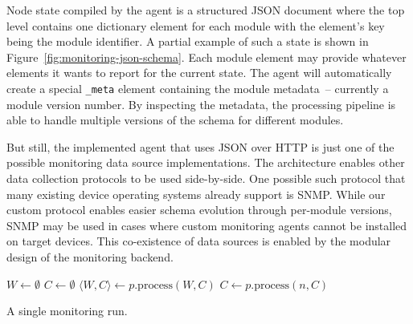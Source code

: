 \documentclass[5p,sort&compress]{elsarticle}
\begin{document}
Node state compiled by the agent is a structured JSON document where the top level contains one dictionary element for each module with the element's key being the module identifier.
A partial example of such a state is shown in Figure~\ref{fig:monitoring-json-schema}.
Each module element may provide whatever elements it wants to report for the current state.
The agent will automatically create a special \texttt{\_meta} element containing the module metadata~-- currently a module version number.
By inspecting the metadata, the processing pipeline is able to handle multiple versions of the schema for different modules.

But still, the implemented agent that uses JSON over HTTP is just one of the possible monitoring data source implementations.
The architecture enables other data collection protocols to be used side-by-side.
One possible such protocol that many existing device operating systems already support is SNMP.
While our custom protocol enables easier schema evolution through per-module versions, SNMP may be used in cases where custom monitoring agents cannot be installed on target devices.
This co-existence of data sources is enabled by the modular design of the monitoring backend.

\begin{algorithm}[t]
\begin{algorithmic}
  \State $W \gets \emptyset$
  \State $C \gets \emptyset$
      \State $\langle W, C \rangle \gets p.\mathrm{process}(W, C)$
        \State $C \gets p.\mathrm{process}(n, C)$
      \EndFor
    \EndIf
  \EndFor
\EndProcedure
\end{algorithmic}
\caption{A single monitoring run.}
\label{alg:monitoring-pipeline}
\end{algorithm}
\end{document}
